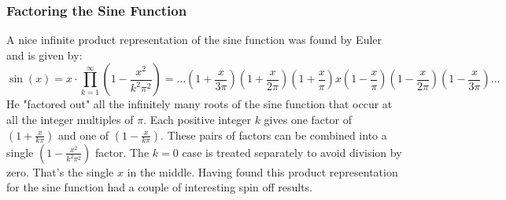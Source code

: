 
%

\subsubsection{Factoring the Sine Function}
A nice infinite product representation of the sine function was found by Euler and is given by:
\begin{equation}
\label{Eq:SineInfProduct}
\sin(x) = x \cdot \prod_{k=1}^{\infty} \left( 1 - \frac{x^2}{k^2 \pi^2}  \right)
        = \ldots \left(1 + \frac{x}{3 \pi}  \right)
                 \left(1 + \frac{x}{2 \pi}  \right) 
                 \left(1 + \frac{x}{  \pi}  \right)
                 x 
                 \left(1 - \frac{x}{  \pi}  \right)
                 \left(1 - \frac{x}{2 \pi}  \right) 
                 \left(1 - \frac{x}{3 \pi}  \right)
          \ldots
\end{equation}
He "factored out" all the infinitely many roots of the sine function that occur at all the integer multiples of $\pi$. Each positive integer $k$ gives one factor of $(1 + \frac{x}{k \pi})$ and one of $(1 - \frac{x}{k \pi})$. These pairs of factors can be combined into a single $(1 - \frac{x^2}{k^2 \pi^2})$ factor. The $k=0$ case is treated separately to avoid division by zero. That's the single $x$ in the middle. Having found this product representation for the sine function had a couple of interesting spin off results.

